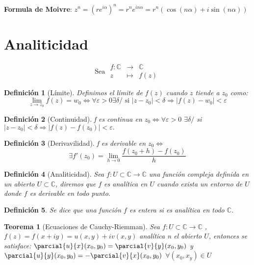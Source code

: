 \documentclass[10pt]{book}
\newtheorem{defi}{Definición}[chapter]
\newtheorem{theorem}{Teorema}[chapter]
\newcommand{\C}{\mathbb{C}}
\begin{document}
\textbf{Formula de Moivre}: $z^n = (re^{i\alpha})^n = r^n e^{in\alpha} = r^n(\cos(n\alpha) + i \sin(n\alpha))$
\newpage
\section{Analiticidad}
$$\text{Sea }\begin{array}{ccc}
f : \mathbb{C} &\longrightarrow& \mathbb{C}\\
z &\longmapsto& f(z)\end{array}$$

\begin{defi}[Límite]
	Definimos el límite de $f(z)$ cuando $z$ tiende a $z_0$ como:
$$ \lim_{z \to z_0} f(z)= w_0 \Leftrightarrow \forall \varepsilon >0 \exists \delta / \text{ si  } |z-z_0| < \delta \Rightarrow |f(z) -w_0|<\varepsilon$$
\end{defi}

\begin{defi}[Continuidad]
f es continua en $z_0 \Leftrightarrow \forall \varepsilon>0$ $\exists \delta /$ si $|z-z_0| < \delta \Rightarrow |f(z)-f(z_0)| < \varepsilon.$
\end{defi}

\begin{defi}[Derivavilidad]
f es derivable en $z_0 \Leftrightarrow$ 
$$\exists f'(z_0) = \lim_{h \to 0} \frac{f(z_0+h)-f(z_0)}{h}$$
\end{defi}


\begin{defi}[Analiticidad]
Sea $f: U \subset \C \longrightarrow \C$ una función compleja definida en un abierto $ U \subset \mathbb{C}$, diremos que $f$ es analítica en $U$ cuando exista un entorno de $U$ donde $f$ es derivable en todo punto.
\end{defi}

\begin{defi}
Se dice que una función $f$ es entera si es analítica en todo $\C$.
\end{defi}

\begin{theorem}[Ecuaciones de Cauchy-Riemman]
Sea $f: U \subset \C \longrightarrow \C$ , $f(z) = f(x+iy) = u(x,y) + iv(x,y)$ analítica n el abierto $U$, entonces se satisface:
$\parcial{u}{x}(x_0,y_0) = \parcial{v}{y}(x_0,y_0)$ y $\parcial{u}{y}(x_0,y_0) = -\parcial{v}{x}(x_0,y_0)$ $ \forall(x_0,x_y) \in U$
\end{theorem}
\end{document}
